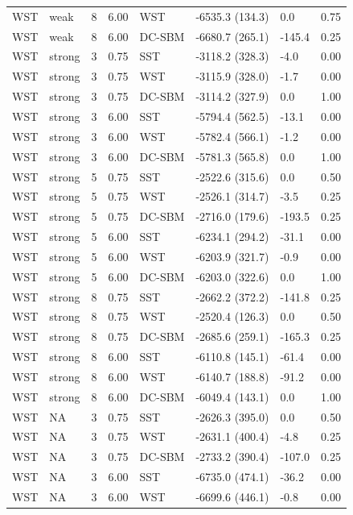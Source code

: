 \begin{table}
\begin{tabular}[t]{llrrllll}
\addlinespace
WST & weak & 8 & 6.00 & WST & -6535.3 (134.3) & 0.0 & 0.75\\
WST & weak & 8 & 6.00 & DC-SBM & -6680.7 (265.1) & -145.4 & 0.25\\
WST & strong & 3 & 0.75 & SST & -3118.2 (328.3) & -4.0 & 0.00\\
WST & strong & 3 & 0.75 & WST & -3115.9 (328.0) & -1.7 & 0.00\\
WST & strong & 3 & 0.75 & DC-SBM & -3114.2 (327.9) & 0.0 & 1.00\\
\addlinespace
WST & strong & 3 & 6.00 & SST & -5794.4 (562.5) & -13.1 & 0.00\\
WST & strong & 3 & 6.00 & WST & -5782.4 (566.1) & -1.2 & 0.00\\
WST & strong & 3 & 6.00 & DC-SBM & -5781.3 (565.8) & 0.0 & 1.00\\
WST & strong & 5 & 0.75 & SST & -2522.6 (315.6) & 0.0 & 0.50\\
WST & strong & 5 & 0.75 & WST & -2526.1 (314.7) & -3.5 & 0.25\\
\addlinespace
WST & strong & 5 & 0.75 & DC-SBM & -2716.0 (179.6) & -193.5 & 0.25\\
WST & strong & 5 & 6.00 & SST & -6234.1 (294.2) & -31.1 & 0.00\\
WST & strong & 5 & 6.00 & WST & -6203.9 (321.7) & -0.9 & 0.00\\
WST & strong & 5 & 6.00 & DC-SBM & -6203.0 (322.6) & 0.0 & 1.00\\
WST & strong & 8 & 0.75 & SST & -2662.2 (372.2) & -141.8 & 0.25\\
\addlinespace
WST & strong & 8 & 0.75 & WST & -2520.4 (126.3) & 0.0 & 0.50\\
WST & strong & 8 & 0.75 & DC-SBM & -2685.6 (259.1) & -165.3 & 0.25\\
WST & strong & 8 & 6.00 & SST & -6110.8 (145.1) & -61.4 & 0.00\\
WST & strong & 8 & 6.00 & WST & -6140.7 (188.8) & -91.2 & 0.00\\
WST & strong & 8 & 6.00 & DC-SBM & -6049.4 (143.1) & 0.0 & 1.00\\
\addlinespace
WST & NA & 3 & 0.75 & SST & -2626.3 (395.0) & 0.0 & 0.50\\
WST & NA & 3 & 0.75 & WST & -2631.1 (400.4) & -4.8 & 0.25\\
WST & NA & 3 & 0.75 & DC-SBM & -2733.2 (390.4) & -107.0 & 0.25\\
WST & NA & 3 & 6.00 & SST & -6735.0 (474.1) & -36.2 & 0.00\\
WST & NA & 3 & 6.00 & WST & -6699.6 (446.1) & -0.8 & 0.00\\

\end{tabular}
\end{table}

